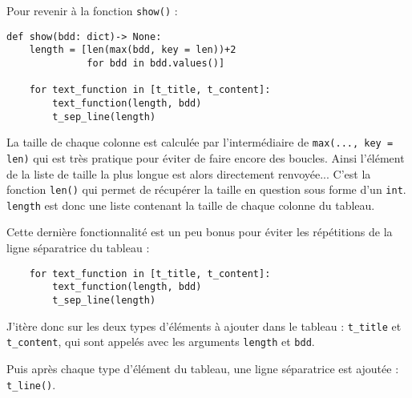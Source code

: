 Pour revenir à la fonction \texttt{show()} :
\begin{lstlisting}
def show(bdd: dict)-> None:
    length = [len(max(bdd, key = len))+2 
              for bdd in bdd.values()]

    for text_function in [t_title, t_content]:
        text_function(length, bdd)
        t_sep_line(length)
\end{lstlisting}
\medskip

La taille de chaque colonne est calculée par l'intermédiaire de \texttt{max(..., key = len)} qui est très pratique pour éviter de faire encore des boucles. Ainsi l'élément de la liste de taille la plus longue est alors directement renvoyée... C'est la fonction \texttt{len()} qui permet de récupérer la taille en question sous forme d'un \texttt{int}. \texttt{length} est donc une liste contenant la taille de chaque colonne du tableau.
\medskip

Cette dernière fonctionnalité est un peu bonus pour éviter les répétitions de la ligne séparatrice du tableau :
\begin{lstlisting}
    for text_function in [t_title, t_content]:
        text_function(length, bdd)
        t_sep_line(length)
\end{lstlisting}
\medskip

J'itère donc sur les deux types d'éléments à ajouter dans le tableau : \texttt{t\_title} et \texttt{t\_content}, qui sont appelés avec les arguments \texttt{length} et \texttt{bdd}.
\medskip

Puis après chaque type d'élément du tableau, une ligne séparatrice est ajoutée : \texttt{t\_line()}.
\medskip
